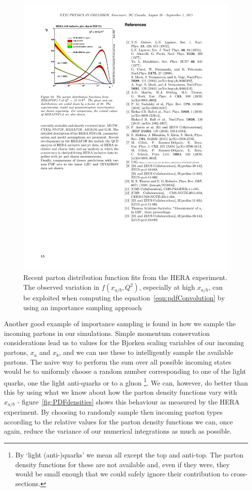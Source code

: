 	\begin{figure}[htp]
		\includegraphics[width=\textwidth]{HERAFit}
		\caption{Recent parton distribution function fits from the HERA experiment.  The observed variation in $f(x_{a/b}, Q^2)$, especially at high
		         $x_{a/b}$, can be exploited when computing the equation~\ref{eqn:pdfConvolution} by using an importance sampling approach}
		\label{fig:heraFit}
  	\end{figure}

  	Another good example of importance sampling is found in how we sample the incoming partons in our simulations.  Simple momentum
  	conservation considerations lead us to values for the Bjorken scaling variables of our incoming partons, $x_a$ and $x_b$, and we
  	can use these to intelligently sample the available partons.  The naive way to perform the sum over all possible incoming states
  	would be to uniformly choose a random number corresponding to one of the light quarks, one the light anti-quarks or to a gluon
  	\footnote{By `light (anti-)quarks' we mean all except the top and anti-top.  The parton density functions for these are not available
  	and, even if they were, they would be small enough that we could safely ignore their contribution to cross-sections.}.  We can,
  	however, do better than this by using what we know about how the parton density functions vary with $x_{a/b}$ - figure~\ref{fig:PDFdensities}
  	shows this behaviour as measured by the HERA experiment.  By choosing to randomly sample then incoming parton types according to the relative values
  	for the parton density functions we can, once again, reduce the variance of our numerical integrations as much as possible.

